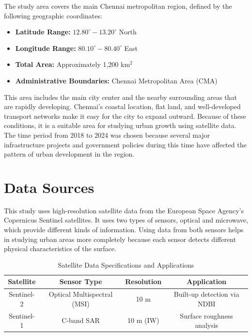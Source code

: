 \documentclass[conference]{IEEEtran}
\begin{document}
The study area covers the main Chennai metropolitan region, defined by the following geographic coordinates:
\begin{itemize}
    \item \textbf{Latitude Range:} $12.80^\circ - 13.20^\circ$ North
    \item \textbf{Longitude Range:} $80.10^\circ - 80.40^\circ$ East
    \item \textbf{Total Area:} Approximately 1,200 km$^2$
    \item \textbf{Administrative Boundaries:} Chennai Metropolitan Area (CMA)
\end{itemize}

This area includes the main city center and the nearby surrounding areas that are rapidly developing. Chennai’s coastal location, flat land, and well-developed transport networks make it easy for the city to expand outward. Because of these conditions, it is a suitable area for studying urban growth using satellite data. The time period from 2018 to 2024 was chosen because several major infrastructure projects and government policies during this time have affected the pattern of urban development in the region.

\section{Data Sources}

This study uses high-resolution satellite data from the European Space Agency’s Copernicus Sentinel satellites. It uses two types of sensors, optical and microwave, which provide different kinds of information. Using data from both sensors helps in studying urban areas more completely because each sensor detects different physical characteristics of the surface.

\begin{table}[htbp]
\renewcommand{\arraystretch}{1.3} %
\caption{Satellite Data Specifications and Applications}
\begin{center}
\begin{tabularx}{\columnwidth}{|C|C|C|C|}
\hline
\textbf{Satellite} & \textbf{Sensor Type} & \textbf{Resolution} & \textbf{Application} \\
\hline
Sentinel-2 & Optical Multispectral (MSI) & 10 m & Built-up detection via NDBI \\
\hline
Sentinel-1 & C-band SAR & 10 m (IW) & Surface roughness analysis \\
\hline
\end{tabularx}
\label{tab_data_sources}
\end{center}
\end{table}
\end{document}
